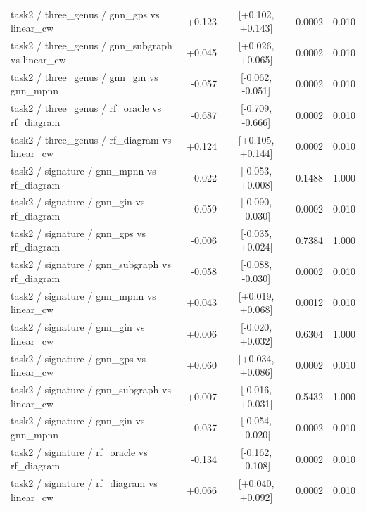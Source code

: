 \begin{longtable}{p{8.2cm} r c r r}
task2 / three\_genus / gnn\_gps vs linear\_cw & +0.123 & [+0.102, +0.143] & 0.0002 & 0.010\\
task2 / three\_genus / gnn\_subgraph vs linear\_cw & +0.045 & [+0.026, +0.065] & 0.0002 & 0.010\\
task2 / three\_genus / gnn\_gin vs gnn\_mpnn & -0.057 & [-0.062, -0.051] & 0.0002 & 0.010\\
task2 / three\_genus / rf\_oracle vs rf\_diagram & -0.687 & [-0.709, -0.666] & 0.0002 & 0.010\\
task2 / three\_genus / rf\_diagram vs linear\_cw & +0.124 & [+0.105, +0.144] & 0.0002 & 0.010\\
task2 / signature / gnn\_mpnn vs rf\_diagram & -0.022 & [-0.053, +0.008] & 0.1488 & 1.000\\
task2 / signature / gnn\_gin vs rf\_diagram & -0.059 & [-0.090, -0.030] & 0.0002 & 0.010\\
task2 / signature / gnn\_gps vs rf\_diagram & -0.006 & [-0.035, +0.024] & 0.7384 & 1.000\\
task2 / signature / gnn\_subgraph vs rf\_diagram & -0.058 & [-0.088, -0.030] & 0.0002 & 0.010\\
task2 / signature / gnn\_mpnn vs linear\_cw & +0.043 & [+0.019, +0.068] & 0.0012 & 0.010\\
task2 / signature / gnn\_gin vs linear\_cw & +0.006 & [-0.020, +0.032] & 0.6304 & 1.000\\
task2 / signature / gnn\_gps vs linear\_cw & +0.060 & [+0.034, +0.086] & 0.0002 & 0.010\\
task2 / signature / gnn\_subgraph vs linear\_cw & +0.007 & [-0.016, +0.031] & 0.5432 & 1.000\\
task2 / signature / gnn\_gin vs gnn\_mpnn & -0.037 & [-0.054, -0.020] & 0.0002 & 0.010\\
task2 / signature / rf\_oracle vs rf\_diagram & -0.134 & [-0.162, -0.108] & 0.0002 & 0.010\\
task2 / signature / rf\_diagram vs linear\_cw & +0.066 & [+0.040, +0.092] & 0.0002 & 0.010\\
\bottomrule
\end{longtable}
